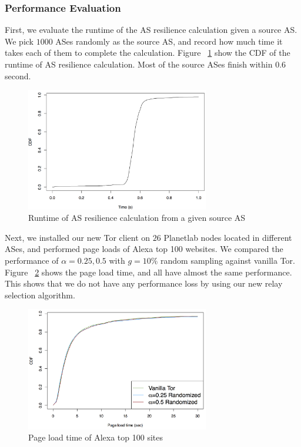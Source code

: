 


\subsubsection{Performance Evaluation}

First, we evaluate the runtime of the AS resilience calculation given a source AS. We pick $1000$ ASes randomly as the source AS, and record how much time it takes each of them to complete the calculation. Figure ~\ref{fig_ascal} show the CDF of the runtime of AS resilience calculation. Most of the source ASes finish within $0.6$ second. 

\begin{figure}[ht!]
\centering
\includegraphics[width=80mm]{figure/runtime}
\caption{Runtime of AS resilience calculation from a given source AS \label{fig_ascal}}
\end{figure}

Next, we installed our new Tor client on $26$ Planetlab nodes located in different ASes, and performed page loads of Alexa top 100 websites. We compared the performance of $\alpha={0.25,0.5}$ with $g=10\%$ random sampling against vanilla Tor. Figure ~\ref{fig_pageload} shows the page load time, and all have almost the same performance. This shows that we do not have any performance loss by using our new relay selection algorithm. 

\begin{figure}[ht!]
\centering
\includegraphics[width=80mm]{figure/pageloadtime}
\caption{Page load time of Alexa top 100 sites \label{fig_pageload}}
\end{figure}



